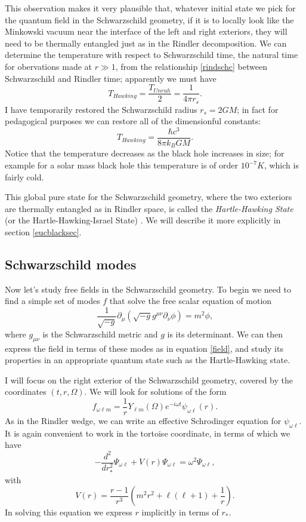\documentclass[12pt]{article}
\newcommand{\be}{\begin{equation}}
\newcommand{\ee}{\end{equation}}
\begin{document}
This observation makes it very plausible that, whatever initial state we pick for the quantum field in the Schwarzschild geometry, if it is to locally look like the Minkowski vacuum near the interface of the left and right exteriors, they will need to be thermally entangled just as in the Rindler decomposition.  We can determine the temperature with respect to Schwarzschild time, the natural time for obervations made at $r\gg1$, from the relationship \ref{rindschc} between Schwarzschild and Rindler time; apparently we must have
\be\label{Thawk}
T_{Hawking}=\frac{T_{Unruh}}{2}=\frac{1}{4\pi r_s}.
\ee
I have temporarily restored the Schwarzschild radius $r_s=2GM$; in fact for pedagogical purposes we can restore all of the dimensionful constants:
\be
T_{Hawking}=\frac{\hbar c^3}{8\pi k_B G M}.
\ee
Notice that the temperature decreases as the black hole increases in size; for example for a solar mass black hole this temperature is of order  $10^{-7}K$, which is fairly cold.  

This global pure state for the Schwarzschild geometry, where the two exteriors are thermally entangled as in Rindler space, is called the \textit{Hartle-Hawking State} (or the Hartle-Hawking-Israel State) \cite{Hartle:1976tp,Israel:1976ur}.  We will describe it more explicitly in section \ref{eucblacksec}. 

\subsection{Schwarzschild modes}\label{modesec}
Now let's study free fields in the Schwarzschild geometry.  To begin we need to find a simple set of modes $f$ that solve the free scalar equation of motion
\be
\frac{1}{\sqrt{-g}}\partial_\mu\left(\sqrt{-g}g^{\mu\nu}\partial_\nu \phi\right)=m^2\phi,
\ee
where $g_{\mu\nu}$ is the Schwarzschild metric and $g$ is its determinant.  We can then express the field in terms of these modes as in equation \eqref{field}, and study its properties in an appropriate quantum state such as the Hartle-Hawking state.   

I will focus on the right exterior of the Schwarzschild geometry, covered by the coordinates $(t,r,\Omega)$.  We will look for 
solutions of the form
\be\label{schmode}
f_{\omega \ell m}=\frac{1}{r}Y_{\ell m}(\Omega) e^{-i \omega t}\psi_{\omega\ell}(r).
\ee
As in the Rindler wedge, we can write an effective Schrodinger equation for $\psi_{\omega\ell}$.  It is again convenient to work in the tortoise coordinate, in terms of which we have
\be\label{modeeq}
-\frac{d^2}{dr_*^2}\Psi_{\omega\ell}+V(r)\Psi_{\omega\ell}=\omega^2\Psi_{\omega\ell},
\ee
with
\be\label{schpot}
V(r)=\frac{r-1}{r^3}\left(m^2r^2+\ell(\ell+1)+\frac{1}{r}\right).
\ee
In solving this equation we express $r$ implicitly in terms of $r_*$.
\end{document}
